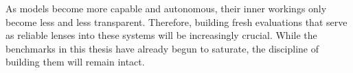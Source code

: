 As models become more capable and autonomous, their inner workings only become less and less transparent.
Therefore, building fresh evaluations that serve as reliable lenses into these systems will be increasingly crucial.
While the benchmarks in this thesis have already begun to saturate, the discipline of building them will remain intact.
